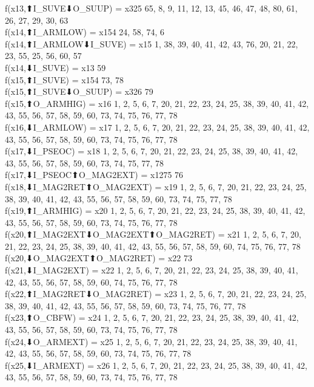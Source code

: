 f(x13,⬆I_SUVE⬇O_SUUP) = x325 {65, 8, 9, 11, 12, 13, 45, 46, 47, 48, 80, 61, 26, 27, 29, 30, 63} \\
f(x14,⬆I_ARMLOW) = x154 {24, 58, 74, 6} \\
f(x14,⬆I_ARMLOW⬇I_SUVE) = x15 {1, 38, 39, 40, 41, 42, 43, 76, 20, 21, 22, 23, 55, 25, 56, 60, 57} \\
f(x14,⬇I_SUVE) = x13 {59} \\
f(x15,⬆I_SUVE) = x154 {73, 78} \\
f(x15,⬆I_SUVE⬇O_SUUP) = x326 {79} \\
f(x15,⬆O_ARMHIG) = x16 {1, 2, 5, 6, 7, 20, 21, 22, 23, 24, 25, 38, 39, 40, 41, 42, 43, 55, 56, 57, 58, 59, 60, 73, 74, 75, 76, 77, 78} \\
f(x16,⬇I_ARMLOW) = x17 {1, 2, 5, 6, 7, 20, 21, 22, 23, 24, 25, 38, 39, 40, 41, 42, 43, 55, 56, 57, 58, 59, 60, 73, 74, 75, 76, 77, 78} \\
f(x17,⬇I_PSEOC) = x18 {1, 2, 5, 6, 7, 20, 21, 22, 23, 24, 25, 38, 39, 40, 41, 42, 43, 55, 56, 57, 58, 59, 60, 73, 74, 75, 77, 78} \\
f(x17,⬇I_PSEOC⬆O_MAG2EXT) = x1275 {76} \\
f(x18,⬇I_MAG2RET⬆O_MAG2EXT) = x19 {1, 2, 5, 6, 7, 20, 21, 22, 23, 24, 25, 38, 39, 40, 41, 42, 43, 55, 56, 57, 58, 59, 60, 73, 74, 75, 77, 78} \\
f(x19,⬆I_ARMHIG) = x20 {1, 2, 5, 6, 7, 20, 21, 22, 23, 24, 25, 38, 39, 40, 41, 42, 43, 55, 56, 57, 58, 59, 60, 73, 74, 75, 76, 77, 78} \\
f(x20,⬆I_MAG2EXT⬇O_MAG2EXT⬆O_MAG2RET) = x21 {1, 2, 5, 6, 7, 20, 21, 22, 23, 24, 25, 38, 39, 40, 41, 42, 43, 55, 56, 57, 58, 59, 60, 74, 75, 76, 77, 78} \\
f(x20,⬇O_MAG2EXT⬆O_MAG2RET) = x22 {73} \\
f(x21,⬇I_MAG2EXT) = x22 {1, 2, 5, 6, 7, 20, 21, 22, 23, 24, 25, 38, 39, 40, 41, 42, 43, 55, 56, 57, 58, 59, 60, 74, 75, 76, 77, 78} \\
f(x22,⬆I_MAG2RET⬇O_MAG2RET) = x23 {1, 2, 5, 6, 7, 20, 21, 22, 23, 24, 25, 38, 39, 40, 41, 42, 43, 55, 56, 57, 58, 59, 60, 73, 74, 75, 76, 77, 78} \\
f(x23,⬆O_CBFW) = x24 {1, 2, 5, 6, 7, 20, 21, 22, 23, 24, 25, 38, 39, 40, 41, 42, 43, 55, 56, 57, 58, 59, 60, 73, 74, 75, 76, 77, 78} \\
f(x24,⬇O_ARMEXT) = x25 {1, 2, 5, 6, 7, 20, 21, 22, 23, 24, 25, 38, 39, 40, 41, 42, 43, 55, 56, 57, 58, 59, 60, 73, 74, 75, 76, 77, 78} \\
f(x25,⬇I_ARMEXT) = x26 {1, 2, 5, 6, 7, 20, 21, 22, 23, 24, 25, 38, 39, 40, 41, 42, 43, 55, 56, 57, 58, 59, 60, 73, 74, 75, 76, 77, 78} \\
